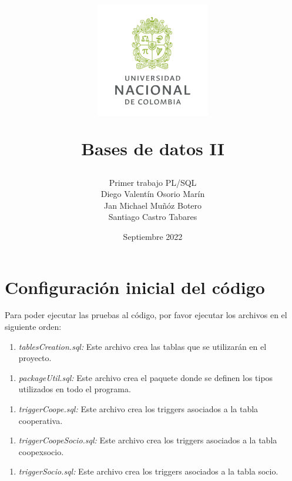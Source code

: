 \documentclass{article}
\title{
    \begin{center}
        \includegraphics[width=5cm, height=5cm]{unal}
    \end{center}
    \vspace{2cm}
    Bases de datos II \\
}
\author{
    \vspace{5cm}
    Primer trabajo PL/SQL \\
    Diego Valentín Osorio Marín \\
    Jan Michael Muñóz Botero \\
    Santiago Castro Tabares
    \vspace{7cm}
}
\date{Septiembre 2022}
\begin{document}
\maketitle

\section{Configuración inicial del código}\label{sec:configuracion-inicial-del-codigo}
    Para poder ejecutar las pruebas al código, por favor ejecutar los archivos en el siguiente orden:
    \begin{enumerate}
    \begin{enumerate}[1.1]
        \item \emph{tablesCreation.sql:} Este archivo crea las tablas que se utilizarán en el proyecto.
    \end{enumerate}
    \end{enumerate}

    \begin{enumerate}
    \begin{enumerate}[1.2]
        \item \emph{packageUtil.sql:} Este archivo crea el paquete donde se definen los tipos utilizados en todo el programa.
    \end{enumerate}
    \end{enumerate}

    \begin{enumerate}
    \begin{enumerate}[1.3]
        \item \emph{triggerCoope.sql:} Este archivo crea los triggers asociados a la tabla cooperativa.
    \end{enumerate}
    \end{enumerate}

    \begin{enumerate}
    \begin{enumerate}[1.4]
        \item \emph{triggerCoopeSocio.sql:} Este archivo crea los triggers asociados a la tabla coopexsocio.
    \end{enumerate}
    \end{enumerate}

    \begin{enumerate}
    \begin{enumerate}[1.5]
        \item \emph{triggerSocio.sql:} Este archivo crea los triggers asociados a la tabla socio.
    \end{enumerate}
    \end{enumerate}
\end{document}
